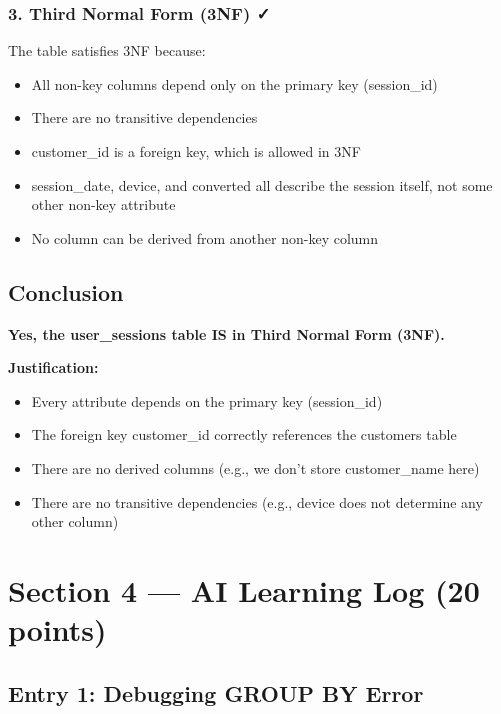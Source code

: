 \documentclass[12pt,a4paper]{article}
\begin{document}
\begin{tcolorbox}
\subsubsection*{3. Third Normal Form (3NF) ✓}
The table satisfies 3NF because:
\begin{itemize}[leftmargin=*,noitemsep,topsep=2pt]
    \item All non-key columns depend only on the primary key (session\_id)
    \item There are no transitive dependencies
    \item customer\_id is a foreign key, which is allowed in 3NF
    \item session\_date, device, and converted all describe the session itself, not some other non-key attribute
    \item No column can be derived from another non-key column
\end{itemize}

\subsection*{Conclusion}

\textbf{Yes, the user\_sessions table IS in Third Normal Form (3NF).}

\textbf{Justification:}
\begin{itemize}[leftmargin=*,noitemsep,topsep=3pt]
    \item Every attribute depends on the primary key (session\_id)
    \item The foreign key customer\_id correctly references the customers table
    \item There are no derived columns (e.g., we don't store customer\_name here)
    \item There are no transitive dependencies (e.g., device does not determine any other column)
\end{itemize}


\end{tcolorbox}

\section{Section 4 — AI Learning Log (20 points)}

\subsection*{Entry 1: Debugging GROUP BY Error}
\end{document}
